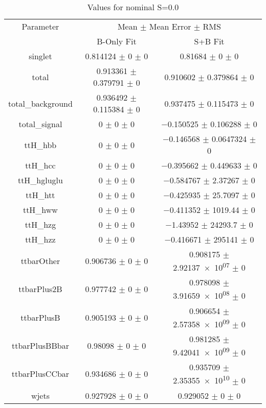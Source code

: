 \begin{table}
\centering
\caption{Values for nominal S=0.0}
\begin{tabular}{ccc}
\toprule
Parameter & \multicolumn{2}{c}{Mean $\pm$ Mean Error $\pm$ RMS}\\
 & B-Only Fit & S+B Fit\\
\midrule
singlet & \num{0.814124} $\pm$ \num{0} $\pm$ \num{0} & \num{0.81684} $\pm$ \num{0} $\pm$ \num{0}\\
total & \num{0.913361} $\pm$ \num{0.379791} $\pm$ \num{0} & \num{0.910602} $\pm$ \num{0.379864} $\pm$ \num{0}\\
total\_background & \num{0.936492} $\pm$ \num{0.115384} $\pm$ \num{0} & \num{0.937475} $\pm$ \num{0.115473} $\pm$ \num{0}\\
total\_signal & \num{0} $\pm$ \num{0} $\pm$ \num{0} & \num{-0.150525} $\pm$ \num{0.106288} $\pm$ \num{0}\\
ttH\_hbb & \num{0} $\pm$ \num{0} $\pm$ \num{0} & \num{-0.146568} $\pm$ \num{0.0647324} $\pm$ \num{0}\\
ttH\_hcc & \num{0} $\pm$ \num{0} $\pm$ \num{0} & \num{-0.395662} $\pm$ \num{0.449633} $\pm$ \num{0}\\
ttH\_hgluglu & \num{0} $\pm$ \num{0} $\pm$ \num{0} & \num{-0.584767} $\pm$ \num{2.37267} $\pm$ \num{0}\\
ttH\_htt & \num{0} $\pm$ \num{0} $\pm$ \num{0} & \num{-0.425935} $\pm$ \num{25.7097} $\pm$ \num{0}\\
ttH\_hww & \num{0} $\pm$ \num{0} $\pm$ \num{0} & \num{-0.411352} $\pm$ \num{1019.44} $\pm$ \num{0}\\
ttH\_hzg & \num{0} $\pm$ \num{0} $\pm$ \num{0} & \num{-1.43952} $\pm$ \num{24293.7} $\pm$ \num{0}\\
ttH\_hzz & \num{0} $\pm$ \num{0} $\pm$ \num{0} & \num{-0.416671} $\pm$ \num{295141} $\pm$ \num{0}\\
ttbarOther & \num{0.906736} $\pm$ \num{0} $\pm$ \num{0} & \num{0.908175} $\pm$ \num{2.92137e+07} $\pm$ \num{0}\\
ttbarPlus2B & \num{0.977742} $\pm$ \num{0} $\pm$ \num{0} & \num{0.978098} $\pm$ \num{3.91659e+08} $\pm$ \num{0}\\
ttbarPlusB & \num{0.905193} $\pm$ \num{0} $\pm$ \num{0} & \num{0.906654} $\pm$ \num{2.57358e+09} $\pm$ \num{0}\\
ttbarPlusBBbar & \num{0.98098} $\pm$ \num{0} $\pm$ \num{0} & \num{0.981285} $\pm$ \num{9.42041e+09} $\pm$ \num{0}\\
ttbarPlusCCbar & \num{0.934686} $\pm$ \num{0} $\pm$ \num{0} & \num{0.935709} $\pm$ \num{2.35355e+10} $\pm$ \num{0}\\
wjets & \num{0.927928} $\pm$ \num{0} $\pm$ \num{0} & \num{0.929052} $\pm$ \num{0} $\pm$ \num{0}\\
\bottomrule
\end{tabular}
\end{table}